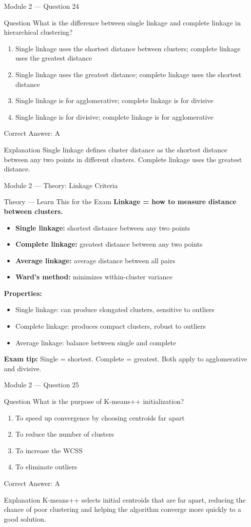 \documentclass[aspectratio=169,10pt]{beamer}
\newcommand{\question}[1]{%
	\begin{block}{Question}
		#1
	\end{block}
}
\newcommand{\options}[4]{%
	\begin{enumerate}[label=\Alph*.,leftmargin=*]
		\item #1
		\item #2
		\item #3
		\item #4
	\end{enumerate}
}
\newcommand{\answerbox}[1]{%
	\begin{exampleblock}{Correct Answer: #1}
	\end{exampleblock}
}
\newcommand{\explain}[1]{%
	\begin{block}{Explanation}
		\small #1
	\end{block}
}
\newcommand{\theory}[1]{%
	\begin{block}{Theory --- Learn This for the Exam}
		\small #1
	\end{block}
}
\begin{document}
	\begin{frame}{Module 2 --- Question 24}
		\question{What is the difference between single linkage and complete linkage in hierarchical clustering?}
		\options{Single linkage uses the shortest distance between clusters; complete linkage uses the greatest distance}{Single linkage uses the greatest distance; complete linkage uses the shortest distance}{Single linkage is for agglomerative; complete linkage is for divisive}{Single linkage is for divisive; complete linkage is for agglomerative}
		\answerbox{A}
		\explain{Single linkage defines cluster distance as the shortest distance between any two points in different clusters. Complete linkage uses the greatest distance.}
	\end{frame}
	
	\begin{frame}{Module 2 --- Theory: Linkage Criteria}
		\theory{
			\textbf{Linkage = how to measure distance between clusters.}
			\begin{itemize}
				\item \textbf{Single linkage:} shortest distance between any two points
				\item \textbf{Complete linkage:} greatest distance between any two points
				\item \textbf{Average linkage:} average distance between all pairs
				\item \textbf{Ward's method:} minimizes within-cluster variance
			\end{itemize}
			\textbf{Properties:}
			\begin{itemize}
				\item Single linkage: can produce elongated clusters, sensitive to outliers
				\item Complete linkage: produces compact clusters, robust to outliers
				\item Average linkage: balance between single and complete
			\end{itemize}
			\textbf{Exam tip:} Single = shortest. Complete = greatest. Both apply to agglomerative and divisive.
		}
	\end{frame}
	
	\begin{frame}{Module 2 --- Question 25}
		\question{What is the purpose of K-means++ initialization?}
		\options{To speed up convergence by choosing centroids far apart}{To reduce the number of clusters}{To increase the WCSS}{To eliminate outliers}
		\answerbox{A}
		\explain{K-means++ selects initial centroids that are far apart, reducing the chance of poor clustering and helping the algorithm converge more quickly to a good solution.}
	\end{frame}
	
\end{document}
